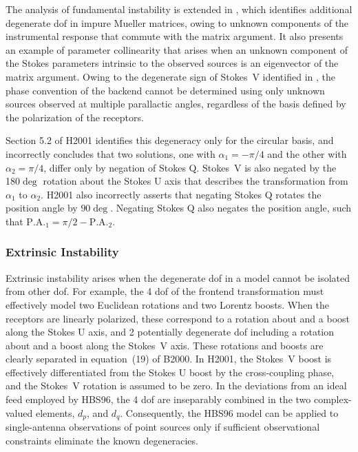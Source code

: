 The analysis of fundamental instability is extended in , which identifies additional degenerate dof in impure Mueller matrices, owing to unknown components of the instrumental response that commute with the matrix argument. It also presents an example of parameter collinearity that arises when an unknown component of the Stokes parameters intrinsic to the observed sources is an eigenvector of the matrix argument.
%
Owing to the degenerate sign of Stokes~V identified in , the phase convention of the backend cannot be determined using only unknown sources observed at multiple parallactic angles, regardless of the basis defined by the polarization of the receptors.

Section 5.2 of H2001 identifies this degeneracy only
for the circular basis, and incorrectly concludes that two solutions, one with $\alpha_1 = -\pi/4$ and the other with $\alpha_2 = \pi/4$, differ only by negation of Stokes Q.
%
Stokes~V is also negated by the 180$\deg$ rotation about the Stokes U axis that describes the transformation from $\alpha_1$ to $\alpha_2$.
%
H2001 also incorrectly asserts that negating Stokes Q  
rotates the position angle by $90\deg$. Negating Stokes Q also negates the position angle, such that $\mathrm{P.A.}_1 = \pi/2 - \mathrm{P.A.}_2$.

\subsubsection{Extrinsic Instability}

Extrinsic instability arises when the degenerate dof in a model cannot be isolated from other dof.
%
For example, the 4 dof of the frontend transformation must effectively model two Euclidean rotations and two Lorentz boosts.
%
When the receptors are linearly polarized, these correspond to a rotation about and a boost along the Stokes U axis, and 2 potentially degenerate dof including a rotation about and a boost along the Stokes~V axis.
%
These rotations and boosts are clearly separated in equation~(19) of B2000.
%
In H2001, the Stokes~V boost is effectively differentiated from the Stokes U boost by the cross-coupling phase, and the Stokes~V rotation 
is assumed to be zero.
%
In the deviations from an ideal feed  employed by HBS96, the 4 dof are inseparably combined in the two complex-valued elements, $d_p$, and $d_q$.
%
Consequently, the HBS96 model can be applied to 
single-antenna observations of point sources only if sufficient observational constraints eliminate the known degeneracies.

